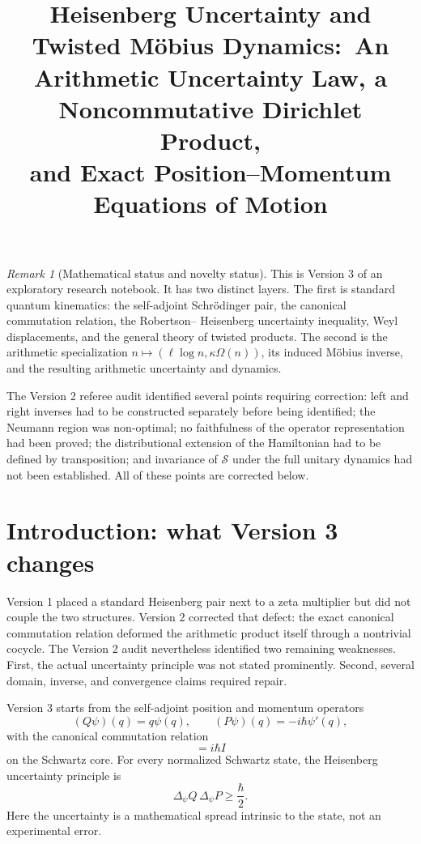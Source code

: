 \documentclass[11pt]{amsart}
\title[Heisenberg Uncertainty and M\"obius Dynamics]{
Heisenberg Uncertainty and Twisted M\"obius Dynamics:\
An Arithmetic Uncertainty Law, a Noncommutative Dirichlet Product,\\
and Exact Position--Momentum Equations of Motion
}
\author{}
\date{}
\numberwithin{equation}{section}
\theoremstyle{plain}
\theoremstyle{definition}
\theoremstyle{remark}
\newtheorem{remark}[theorem]{Remark}
\begin{document}
\maketitle

\tableofcontents

\bigskip

\begin{remark}[Mathematical status and novelty status]
\label{rem:status}
This is Version 3 of an exploratory research notebook.  It has two distinct
layers.  The first is standard quantum kinematics: the self-adjoint
Schr\"odinger pair, the canonical commutation relation, the Robertson--
Heisenberg uncertainty inequality, Weyl displacements, and the general theory
of twisted products.  The second is the arithmetic specialization
\(n\mapsto(\ell\log n,\kappa\Omega(n))\), its induced M\"obius inverse,
and the resulting arithmetic uncertainty and dynamics.

The Version 2 referee audit identified several points requiring correction:
left and right inverses had to be constructed separately before being
identified; the Neumann region was non-optimal; no faithfulness of the
operator representation had been proved; the distributional extension of the
Hamiltonian had to be defined by transposition; and invariance of
\(\mathcal S\) under the full unitary dynamics had not been established.
All of these points are corrected below.

\end{remark}

\section{Introduction: what Version 3 changes}
\label{sec:introduction}

Version 1 placed a standard Heisenberg pair next to a zeta multiplier but did
not couple the two structures.  Version 2 corrected that defect: the exact
canonical commutation relation deformed the arithmetic product itself through
a nontrivial cocycle.  The Version 2 audit nevertheless identified two
remaining weaknesses.  First, the actual uncertainty principle was not stated
prominently.  Second, several domain, inverse, and convergence claims required
repair.

Version 3 starts from the self-adjoint position and momentum operators
\begin{equation}
(Q\psi)(q)=q\psi(q),
\qquad
(P\psi)(q)=-i\hbar\psi'(q),
\label{eq:intro_QP}
\end{equation}
with the canonical commutation relation
\begin{equation}
[Q,P]=i\hbar I
\label{eq:intro_CCR}
\end{equation}
on the Schwartz core.  For every normalized Schwartz state, the Heisenberg uncertainty principle is
\begin{equation}
\boxed{\Delta_\psi Q\,\Delta_\psi P\ge\frac{\hbar}{2}.}
\label{eq:intro_heisenberg_uncertainty}
\end{equation}
Here the uncertainty is a mathematical spread intrinsic to the state, not an
experimental error.
\end{document}
